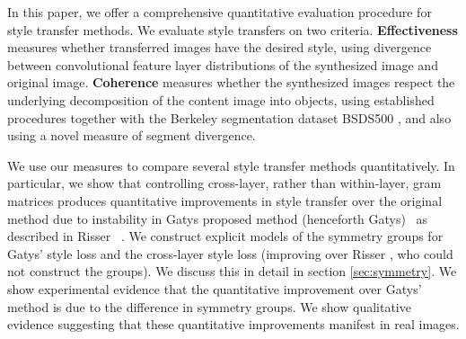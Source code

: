 \documentclass[runningheads]{llncs}
\begin{document}
  In this paper, %
we offer a comprehensive quantitative evaluation procedure for style transfer methods. We evaluate style transfers on two criteria.  {\bf Effectiveness} measures whether transferred images have the desired style, using divergence between
convolutional feature layer distributions of the synthesized image and original image.  {\bf Coherence} measures whether the synthesized images respect the underlying
decomposition of the content image into objects, using established procedures together with the Berkeley segmentation dataset BSDS500 \cite{arbelaez2011contour}, and also using a novel measure of segment divergence.

We use our measures to compare several style transfer methods quantitatively.  
In particular, we show that controlling cross-layer, rather than within-layer, gram matrices produces quantitative improvements in style transfer over the original method due to instability in Gatys \ea proposed method (henceforth  Gatys)~\cite{gatys2016image} as described in Risser \ea~\cite{risser2017stable}.  
We construct explicit models of the symmetry groups for Gatys' style loss and the cross-layer style loss 
(improving over Risser \ea, who could not construct the groups). We discuss this in detail in section \ref{sec:symmetry}.  We show experimental evidence that 
the quantitative improvement over Gatys' method is due to the difference in symmetry groups. 
We show qualitative evidence suggesting that these quantitative improvements manifest in real images.
\end{document}
